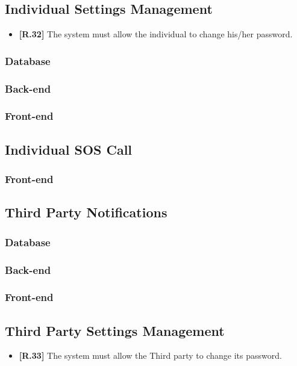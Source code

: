 \subsection{Individual Settings Management}
\begin{itemize}
	\item {\color{ProcessBlue}\textbf{[R.32]}} The system must allow the individual to change his/her password.
\end{itemize}
\subsubsection*{Database}


\subsubsection*{Back-end}


\subsubsection*{Front-end}

\subsection{Individual SOS Call}

\subsubsection*{Front-end}

\subsection{Third Party Notifications}

\subsubsection*{Database}


\subsubsection*{Back-end}


\subsubsection*{Front-end}

\subsection{Third Party Settings Management}
\begin{itemize}
	\item {\color{ProcessBlue}\textbf{[R.33]}} The system must allow the Third party to change its password.
\end{itemize}
